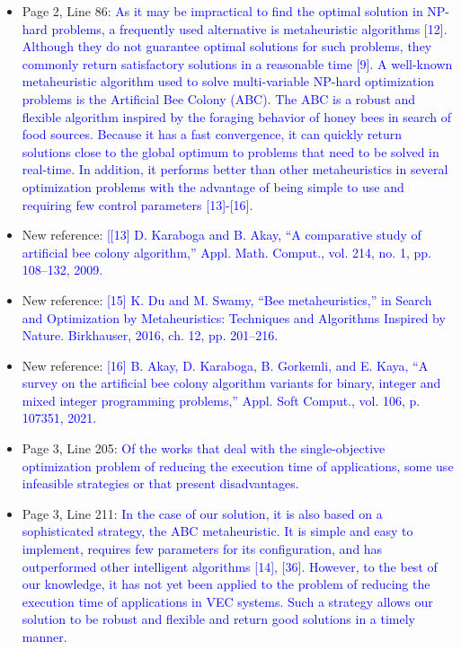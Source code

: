 \begin{itemize}
    \item Page 2, Line 86: \textcolor{blue}{As it may be impractical to find the optimal solution in NP-hard problems, a frequently used alternative is metaheuristic algorithms [12]. Although they do not guarantee optimal solutions for such problems, they commonly return satisfactory solutions in a reasonable time [9]. A well-known metaheuristic algorithm used to solve multi-variable NP-hard optimization problems is the Artificial Bee Colony (ABC). The ABC is a robust and flexible algorithm inspired by the foraging behavior of honey bees in search of food sources. Because it has a fast convergence, it can quickly return solutions close to the global optimum to problems that need to be solved in real-time. In addition, it performs better than other metaheuristics in several optimization problems with the advantage of being simple to use and requiring few control parameters [13]-[16].}
    \item New reference: \textcolor{blue}{[[13] D. Karaboga and B. Akay, “A comparative study of artificial bee colony algorithm,” Appl. Math. Comput., vol. 214, no. 1, pp. 108–132, 2009.}
    \item New reference: \textcolor{blue}{[15] K. Du and M. Swamy, “Bee metaheuristics,” in Search and Optimization by Metaheuristics: Techniques and Algorithms Inspired by Nature. Birkhauser, 2016, ch. 12, pp. 201–216.}
    \item New reference: \textcolor{blue}{[16] B. Akay, D. Karaboga, B. Gorkemli, and E. Kaya, “A survey on the artificial bee colony algorithm variants for binary, integer and mixed integer programming problems,” Appl. Soft Comput., vol. 106, p. 107351, 2021.}
    \item Page 3, Line 205: \textcolor{blue}{Of the works that deal with the single-objective optimization problem of reducing the execution time of applications, some use infeasible strategies or that present disadvantages.}
    \item Page 3, Line 211: \textcolor{blue}{In the case of our solution, it is also based on a sophisticated strategy, the ABC metaheuristic. It is simple and easy to implement, requires few parameters for its configuration, and has outperformed other intelligent algorithms [14], [36]. However, to the best of our knowledge, it has not yet been applied to the problem of reducing the execution time of applications in VEC systems. Such a strategy allows our solution to be robust and flexible and return good solutions in a timely manner.}    
\end{itemize}

